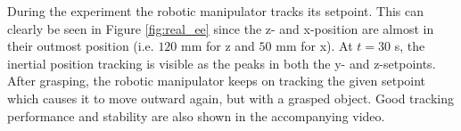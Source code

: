 \documentclass[a4paper, 10pt, conference]{ieeeconf}
\begin{document}
During the experiment the robotic manipulator tracks its setpoint. This can clearly be seen in Figure \ref{fig:real_ee} since the z- and x-position are almost in their outmost position (i.e. $120$ mm for z and $50$ mm for x). At $t=30$ s, the inertial position tracking is visible as the
peaks in both the y- and z-setpoints. After grasping, the robotic
manipulator keeps on tracking the given setpoint which causes it to
move outward again, but with a grasped object. Good tracking
performance and stability are also shown in the accompanying video.

%
%
%
%
%
%
%
\end{document}
